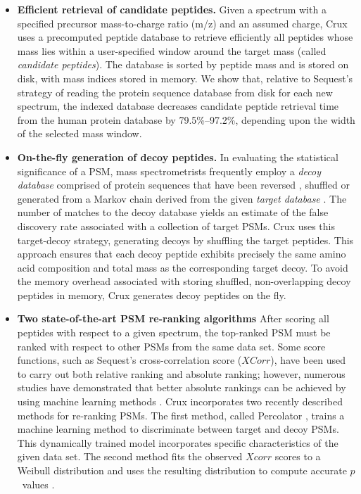 \documentclass[12pt]{article}
\begin{document}
\begin{itemize}
\item {\bf Efficient retrieval of candidate peptides.}  Given a
  spectrum with a specified precursor mass-to-charge ratio (m/z) and
  an assumed charge, Crux uses a precomputed peptide database to
  retrieve efficiently all peptides whose mass lies within a
  user-specified window around the target mass (called {\em candidate
  peptides}).  The database is sorted by peptide mass and is stored on
  disk, with mass indices stored in memory.  We show that, relative to
  {\sc Sequest}'s strategy of reading the protein sequence database
  from disk for each new spectrum, the indexed database decreases
  candidate peptide retrieval time from the human protein database by
  79.5\%--97.2\%, depending upon the width of the selected mass window.

\item {\bf On-the-fly generation of decoy peptides.}  In evaluating
  the statistical significance of a PSM, mass spectrometrists
  frequently employ a {\em decoy database} comprised of protein
  sequences that have been reversed \cite{moore:qscore}, shuffled
  \cite{klammer:effects} or generated from a Markov chain derived from
  the given {\em target database} \cite{colinge:olav}.  The number of
  matches to the decoy database yields an estimate of the false
  discovery rate associated with a collection of target PSMs.  Crux
  uses this target-decoy strategy, generating decoys by shuffling the
  target peptides.  This approach ensures that each decoy peptide
  exhibits precisely the same amino acid composition and total mass as
  the corresponding target decoy.  To avoid the memory overhead
  associated with storing shuffled, non-overlapping decoy peptides in
  memory, Crux generates decoy peptides on the fly.

\item {\bf Two state-of-the-art PSM re-ranking algorithms} After
  scoring all peptides with respect to a given spectrum, the
  top-ranked PSM must be ranked with respect to other PSMs from the
  same data set.  Some score functions, such as {\sc Sequest}'s
  cross-correlation score ($XCorr$), have been used to carry out both
  relative ranking and absolute ranking; however, numerous studies
  have demonstrated that better absolute rankings can be achieved by
  using machine learning methods \cite{keller:empirical, anderson:new,
  elias:intensity, kall:semi-supervised}.  Crux incorporates two
  recently described methods for re-ranking PSMs.  The first method,
  called Percolator \cite{kall:semi-supervised}, trains a machine
  learning method to discriminate between target and decoy PSMs.  This
  dynamically trained model incorporates specific characteristics of
  the given data set.  The second method fits the observed $Xcorr$
  scores to a Weibull distribution and uses the resulting distribution
  to compute accurate $p$~values \cite{klammer:not}.


\end{itemize}
\end{document}

